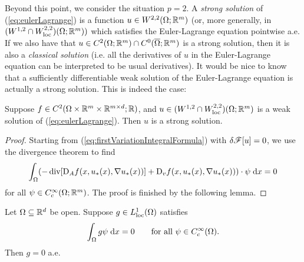 Beyond this point, we consider the situation $p=2$. A \textit{strong solution} of (\ref{eq:eulerLagrange}) is a function $u \in W^{2,2}(\Omega;\mathbb{R}^m)$ (or, more generally, in $(W^{1,2} \cap W^{2,2}_{\rm loc})(\Omega;\mathbb{R}^m))$ which satisfies the Euler-Lagrange equation pointwise a.e. If we also have that $u \in C^2(\Omega;\mathbb{R}^m) \cap C^0(\overline{\Omega};\mathbb{R}^m)$ is a strong solution, then it is also a \textit{classical solution} (i.e. all the derivatives of $u$ in the Euler-Lagrange equation can be interpreted to be usual derivatives). It would be nice to know that a sufficiently differentiable weak solution of the Euler-Lagrange equation is actually a strong solution. This is indeed the case:
\begin{proposition}
    Suppose $f \in C^2(\Omega \times \mathbb{R}^m \times \mathbb{R}^{m \times d};\mathbb{R})$, and $u \in (W^{1,2} \cap W^{2,2}_{\rm loc})(\Omega;\mathbb{R}^m)$ is a weak solution of (\ref{eq:eulerLagrange}). Then $u$ is a strong solution. 
\end{proposition}
\begin{proof}
    Starting from (\ref{eq:firstVariationIntegralFormula}) with $\delta\mathscr{F}[u] = 0$, we use the divergence theorem to find
    \begin{equation}
        \int_\Omega ( -\operatorname{div}[\mathrm{D}_A f(x,u_*(x),\nabla u_*(x))] + \mathrm{D}_v f(x,u_*(x),\nabla u_*(x)) )\cdot \psi \; \mathrm{d} x = 0
    \end{equation}
    for all $\psi \in C_c^\infty(\Omega;\mathbb{R}^m)$. The proof is finished by the following lemma.
\end{proof}
\begin{lemma}
    Let $\Omega \subseteq \mathbb{R}^d$ be open. Suppose $g \in L^1_{\rm loc}(\Omega)$ satisfies 
    \begin{equation}
        \int_\Omega g\psi \; \mathrm{d} x = 0 \hspace{20pt} \text{for all } \psi \in C_c^\infty(\Omega).
    \end{equation}
    Then $g = 0$ a.e.
\end{lemma}
